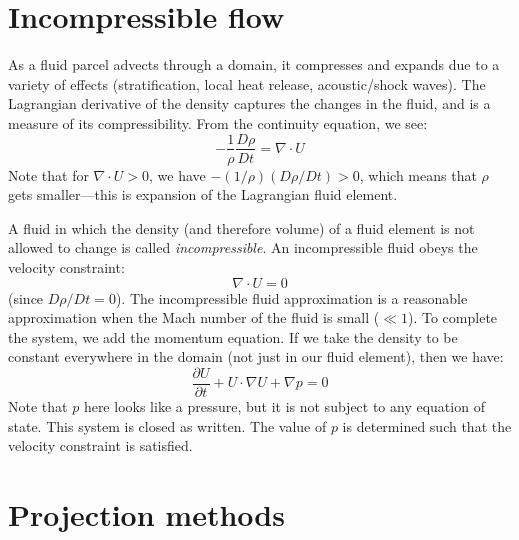 \label{ch:incompressible}

\begin{quote}
\end{quote}

\section{Incompressible flow}

As a fluid parcel advects through a domain, it compresses and expands
due to a variety of effects (stratification, local heat release,
acoustic/shock waves).  The Lagrangian derivative of the density
captures the changes in the fluid, and is a measure of its compressibility.
From the continuity equation, we see:
\begin{equation}
-\frac{1}{\rho}\frac{D\rho}{Dt} = \nabla \cdot U
\end{equation}
Note that for $\nabla \cdot U > 0$, we have $-(1/\rho) (D\rho/Dt) > 0$,
which means that $\rho$ gets smaller---this is expansion of the Lagrangian
fluid element.

A fluid in which the density (and therefore volume) of a fluid element is not
allowed to change is called {\em incompressible}.  An incompressible
fluid obeys the velocity constraint:
\begin{equation}
\nabla \cdot U = 0
\end{equation}
(since $D\rho / Dt = 0$).  The incompressible fluid approximation is 
a reasonable approximation when the Mach number of the fluid is small
($\ll 1$).  To complete the system, we add the momentum equation.  If 
we take the density to be constant everywhere in the domain (not just
in our fluid element), then we have:
\begin{equation}
\frac{\partial U}{\partial t} + U \cdot \nabla U + \nabla p = 0
\end{equation}
Note that $p$ here looks like a pressure, but it is not subject to
any equation of state.  This system is closed as written.  The value
of $p$ is determined such that the velocity constraint is satisfied.



\section{Projection methods}

